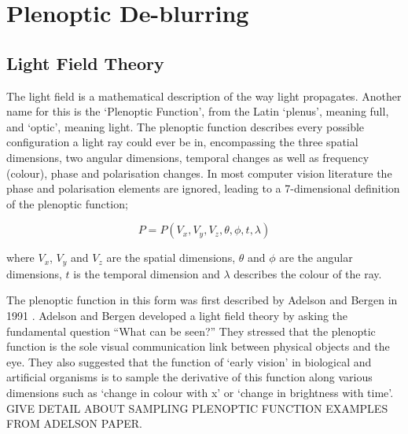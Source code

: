 
\chapter{Plenoptic De-blurring}
\label{chap:plenoptic_deblurring}

\section{Light Field Theory}
\label{sec:light_field_theory}



The light field is a mathematical description of the way light propagates.
Another name for this is the \enquote*{Plenoptic Function}, from the Latin \enquote*{plenus}, meaning full, and \enquote*{optic}, meaning light.
The plenoptic function describes every possible configuration a light ray could ever be in, encompassing the three spatial dimensions, two angular dimensions, temporal changes as well as frequency (colour), phase and polarisation changes.
In most computer vision literature the phase and polarisation elements are ignored, leading to a 7-dimensional definition of the plenoptic function;

\begin{equation}
\label{eq:plenoptic_function}
P = P(V_x, V_y, V_z, \theta, \phi, t, \lambda)
\end{equation}

where $V_x$, $V_y$ and $V_z$ are the spatial dimensions, $\theta$ and $\phi$ are the angular dimensions, $t$ is the temporal dimension and $\lambda$ describes the colour of the ray. 

The plenoptic function in this form was first described by Adelson and Bergen in 1991 \cite{adelson1991plenoptic}.
Adelson and Bergen developed a light field theory by asking the fundamental question \enquote{What can be seen?} They stressed that the plenoptic function is the sole visual communication link between physical objects and the eye.
They also suggested that the function of \enquote*{early vision} in biological and artificial organisms is to sample the derivative of this function along various dimensions such as \enquote*{change in colour with x} or \enquote*{change in brightness with time}.
GIVE DETAIL ABOUT SAMPLING PLENOPTIC FUNCTION EXAMPLES FROM ADELSON PAPER.

